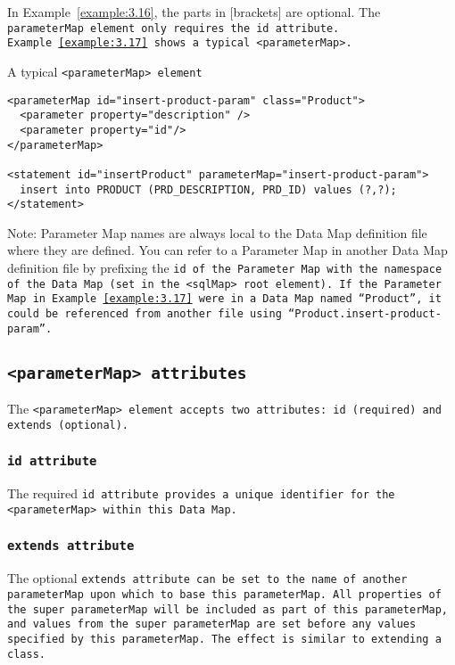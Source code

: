 In Example~\ref{example:3.16}, the parts in [brackets] are optional. The
\tt{parameterMap} element only requires the id attribute.
Example~\ref{example:3.17} shows a typical \tt{<parameterMap>}.

\begin{example}\label{example:3.17}
A typical \tt{<parameterMap>} element
\begin{verbatim}
<parameterMap id="insert-product-param" class="Product">
  <parameter property="description" />
  <parameter property="id"/>
</parameterMap>

<statement id="insertProduct" parameterMap="insert-product-param">
  insert into PRODUCT (PRD_DESCRIPTION, PRD_ID) values (?,?);
</statement>
\end{verbatim}
\end{example}

\begin{mybox}{Note:}
Parameter Map names are always local to the Data Map definition file where
they are defined. You can refer to a Parameter Map in another Data Map
definition file by prefixing the \tt{id} of the Parameter Map with the
namespace of the Data Map (set in the \tt{<sqlMap>} root element). If the
Parameter Map in Example~\ref{example:3.17} were in a Data Map named
``Product'', it could be referenced from another file using
``Product.insert-product-param''.
\end{mybox}

\subsection{\tt{<parameterMap>} attributes} The \tt{<parameterMap>} element
accepts two attributes: \tt{id} (required) and \tt{extends} (optional).

\subsubsection{\tt{id} attribute} The required \tt{id} attribute provides a
unique identifier for the \tt{<parameterMap>} within this Data Map.

\subsubsection{\tt{extends} attribute}
The optional \tt{extends} attribute can be set to the name of another
\tt{parameterMap} upon which to base this \tt{parameterMap}. All properties of
the super \tt{parameterMap} will be included as part of this
\tt{parameterMap}, and values from the super \tt{parameterMap} are set before
any values specified by this \tt{parameterMap}. The effect is similar to
extending a class.

